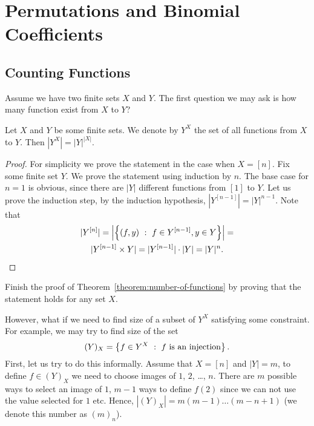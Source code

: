 \chapter{Permutations and Binomial Coefficients}
\section{Counting Functions}
Assume we have two finite sets $X$ and $Y$. The first question we may ask is
how many function exist from $X$ to $Y$?


\begin{theorem}
\label{theorem:number-of-functions}
  Let $X$ and $Y$ be some finite sets. We denote by $Y^X$ the set of all
  functions from $X$ to $Y$. Then $|Y^X| = |Y|^{|X|}$.
\end{theorem}
\begin{proof}
  For simplicity we prove the statement in the case when $X = [n]$. Fix some
  finite set $Y$. We prove the statement using induction by $n$. The base case
  for $n = 1$ is obvious, since there are $|Y|$ different functions from $[1]$
  to $Y$. Let us prove the induction step, by the induction hypothesis,
  $|Y^{[n - 1]}| = |Y|^{n - 1}$. Note that
  \begin{multline*}
    |Y^{[n]}| = \left| \set[f \in Y^{[ n - 1]}, y \in Y]{(f, y)} \right| = \\
    |Y^{[n - 1]} \times Y| = |Y^{[n - 1]}| \cdot |Y| = |Y|^n.
  \end{multline*}
\end{proof}

\begin{exercise}
  Finish the proof of Theorem~\ref{theorem:number-of-functions} by proving that
  the statement holds for any set $X$.
\end{exercise}

However, what if we need to find size of a subset of $Y^X$ satisfying some
constraint. For example, we may try to find size of the set
\[
  (Y)_X = \set[f\text{ is an injection}]{f \in Y^X}.
\]
First, let us try to do this informally. Assume that $X = [n]$ and $|Y| = m$,
to define $f \in (Y)_X$ we need to choose images of $1$, $2$, \dots, $n$. There
are $m$ possible ways to select an image of $1$, $m - 1$ ways to define $f(2)$
since we can not use the value selected for $1$ etc. Hence,
$|(Y)_X| = m (m - 1) \dots (m - n + 1)$ (we denote this number as $(m)_n$).

